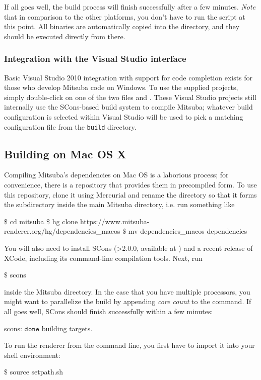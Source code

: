 If all goes well, the build process will finish successfully after a few
minutes. \emph{Note} that in comparison to the other platforms, you don't have to run the  script at this point.
All binaries are automatically copied into the  directory, and they should be executed directly from there.

\subsubsection{Integration with the Visual Studio interface}
Basic Visual Studio 2010 integration with support for code completion
exists for those who develop Mitsuba code on Windows.
To use the supplied projects, simply double-click on one of the two files 
and . These Visual Studio projects still internally
use the SCons-based build system to compile Mitsuba; whatever
build configuration is selected within Visual Studio will be used to pick a matching
configuration file from the \texttt{build} directory.

\subsection{Building on Mac OS X}
\vspace{-5mm}
Compiling Mitsuba's dependencies on Mac OS is a laborious process; for convenience, there
is a repository that provides them in precompiled form. To use this repository, clone it
using Mercurial and rename the directory so that it forms the  subdirectory
inside the main Mitsuba directory, i.e. run something like
\begin{shell}
$\text{\$}$ cd mitsuba
$\text{\$}$ hg clone https://www.mitsuba-renderer.org/hg/dependencies_macos
$\text{\$}$ mv dependencies_macos dependencies
\end{shell}
You will also need to install SCons (>2.0.0, available at ) and
a recent release of XCode, including its command-line compilation tools. Next, run
\begin{shell}
$\text{\$}$ scons
\end{shell}
inside the Mitsuba directory. In the case that you have multiple processors, you might want to parallelize the build by appending \emph{core count} to the command.
If all goes well, SCons should finish successfully within a few minutes:
\begin{shell}
scons: $\texttt{done}$ building targets.
\end{shell}
To run the renderer from the command line, you first have to import it into your shell environment:
\begin{shell}
$\text{\$}$ source setpath.sh
\end{shell}

